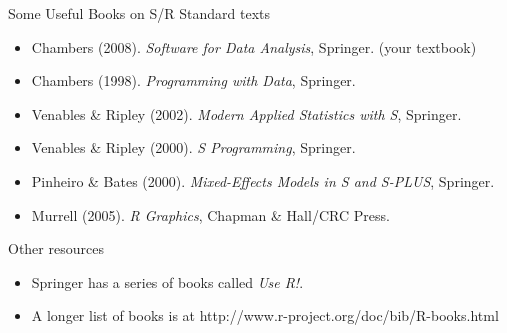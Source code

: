 \documentclass[aspectratio=169]{beamer}
\begin{document}
\begin{frame}{Some Useful Books on S/R}
Standard texts
\begin{itemize}
\item
Chambers (2008). \textit{Software for Data Analysis}, Springer. (your
textbook)
\item
Chambers (1998). \textit{Programming with Data}, Springer.
\item
Venables \& Ripley (2002). \textit{Modern Applied Statistics with S},
Springer.
\item
Venables \& Ripley (2000). \textit{S Programming}, Springer.
\item
Pinheiro \& Bates (2000). \textit{Mixed-Effects Models in S and
S-PLUS}, Springer.
\item
Murrell (2005). \textit{R Graphics}, Chapman \& Hall/CRC Press.
\end{itemize}
Other resources
\begin{itemize}
\item
Springer has a series of books called \textit{Use R!}.
\item
A longer list of books is at
http://www.r-project.org/doc/bib/R-books.html
\end{itemize}
\end{frame}
\end{document}
